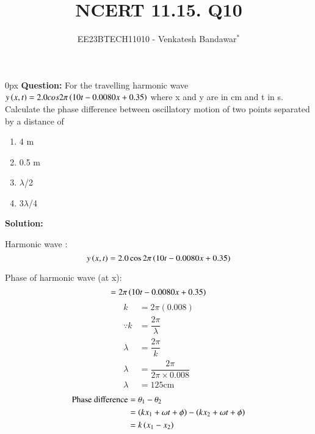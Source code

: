\documentclass[journal,12pt,twocolumn]{IEEEtran}
\theoremstyle{remark}
\begin{document}

\vspace{3cm}

\title{NCERT 11.15. Q10}
\author{EE23BTECH11010 - Venkatesh Bandawar$^{*}$%
}
\maketitle
\newpage
\bigskip

\renewcommand{\thefigure}{\theenumi}
\renewcommand{\thetable}{\theenumi}



\parindent 0px
\textbf{Question:} For the travelling harmonic wave
$y\left(x, t\right) = 2.0 cos 2\pi \left(10t - 0.0080 x + 0.35\right)$ where x and y are in cm and t in s. Calculate the phase difference between oscillatory
motion of two points separated by a distance of 

\begin{enumerate} [label=(\alph*)]
    \item 4 m
    \item 0.5 m
    \item $\lambda$/2
    \item 3$\lambda$/4
\end{enumerate}

\textbf{Solution:}  
\begin{table}[htbp] \small
\centering

\end{table}
Harmonic wave :
\begin{equation}
    y\left(x, t\right) = 2.0 \cos 2\pi \left(10t - 0.0080 x + 0.35\right)
\end{equation}

Phase of harmonic wave (at x):
\begin{equation}
    = 2\pi \left(10t - 0.0080x + 0.35\right)
\end{equation}
\begin{align}
    k &= 2\pi(0.008) \label{} \\
    \because k &= \dfrac{2\pi}{\lambda} \\
    \lambda &= \dfrac{2\pi}{k} \\
    \lambda &= \dfrac{2\pi}{2 \pi \times 0.008}\nonumber \\
    \lambda &= 125 \text{cm}
\end{align}
\begin{align}
    \text{Phase difference} &= \theta_1 - \theta_2 \\
    &= \left(kx_1 + \omega t + \phi\right) - \left(kx_2 + \omega t + \phi\right)\\
    &= k\left(x_1 - x_2\right) \label{equation for phase difference}
\end{align}
\end{document}
